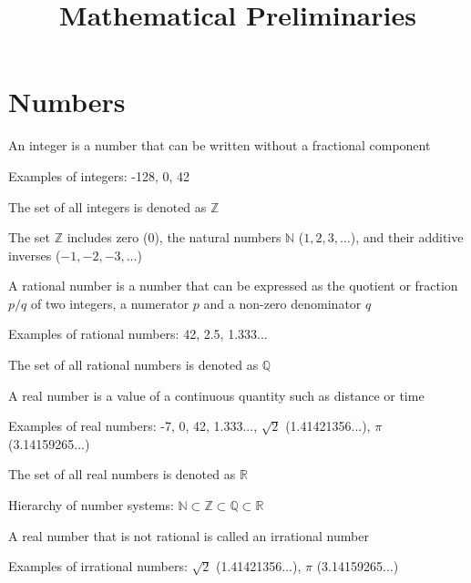 \documentclass[8pt,a4paper,compress]{beamer}
\title{Mathematical Preliminaries}
\date{}
\begin{document}
\begin{frame}
\vfill
\titlepage
\end{frame}

\section{Numbers}
\begin{frame}[fragile]
\pause\transdissolve

An integer is a number that can be written without a fractional component

\pause\transdissolve\bigskip

Examples of integers: -128, 0, 42

\pause\transdissolve\bigskip

The set of all integers is denoted as $\mathbb{Z}$

\pause\transdissolve\bigskip

The set $\mathbb{Z}$ includes zero (0), the natural numbers $\mathbb{N}$ ($1, 2, 3, \dots$), and their additive inverses ($-1, -2, -3, \dots$)
\end{frame}

\begin{frame}[fragile]
\pause\transdissolve

A rational number is a number that can be expressed as the quotient or fraction $p/q$ of two integers, a numerator $p$ and a non-zero denominator $q$

\pause\transdissolve\bigskip

Examples of rational numbers: 42, 2.5, 1.333...

\pause\transdissolve\bigskip

The set of all rational numbers is denoted as $\mathbb{Q}$
\end{frame}

\begin{frame}[fragile]
\pause\transdissolve

A real number is a value of a continuous quantity such as distance or time

\pause\transdissolve\bigskip

Examples of real numbers: -7, 0, 42, 1.333..., $\sqrt{2}$ (1.41421356...), $\pi$ (3.14159265...)

\pause\transdissolve\bigskip

The set of all real numbers is denoted as $\mathbb{R}$

\pause\transdissolve\bigskip

Hierarchy of number systems: $\mathbb{N} \subset \mathbb{Z} \subset \mathbb{Q} \subset \mathbb{R}$

\pause\transdissolve\bigskip

A real number that is not rational is called an irrational number

\pause\transdissolve\bigskip

Examples of irrational numbers: $\sqrt{2}$ (1.41421356...), $\pi$ (3.14159265...)
\end{frame}
\end{document}
